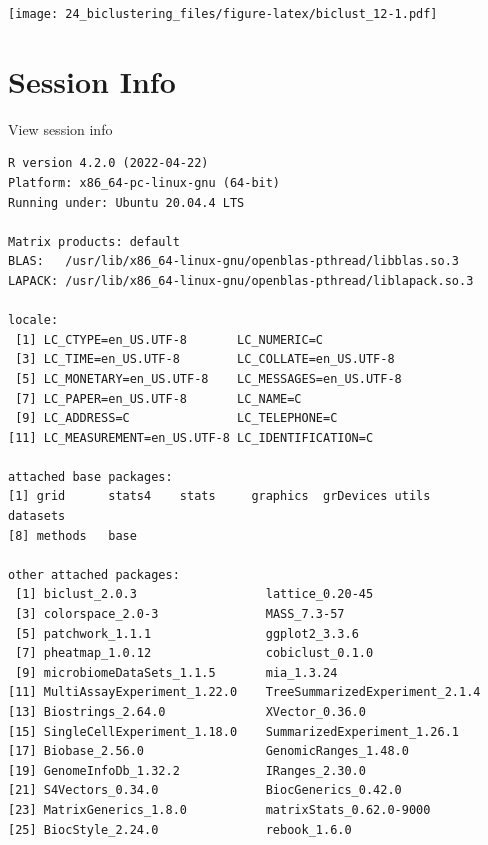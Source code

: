 \documentclass[
]{book}
\begin{document}
\texttt{[image: 24\_biclustering\_files/figure-latex/biclust\_12-1.pdf]}

\hypertarget{session-info-7}{%
\section*{Session Info}\label{session-info-7}}

View session info

\begin{verbatim}
R version 4.2.0 (2022-04-22)
Platform: x86_64-pc-linux-gnu (64-bit)
Running under: Ubuntu 20.04.4 LTS

Matrix products: default
BLAS:   /usr/lib/x86_64-linux-gnu/openblas-pthread/libblas.so.3
LAPACK: /usr/lib/x86_64-linux-gnu/openblas-pthread/liblapack.so.3

locale:
 [1] LC_CTYPE=en_US.UTF-8       LC_NUMERIC=C              
 [3] LC_TIME=en_US.UTF-8        LC_COLLATE=en_US.UTF-8    
 [5] LC_MONETARY=en_US.UTF-8    LC_MESSAGES=en_US.UTF-8   
 [7] LC_PAPER=en_US.UTF-8       LC_NAME=C                 
 [9] LC_ADDRESS=C               LC_TELEPHONE=C            
[11] LC_MEASUREMENT=en_US.UTF-8 LC_IDENTIFICATION=C       

attached base packages:
[1] grid      stats4    stats     graphics  grDevices utils     datasets 
[8] methods   base     

other attached packages:
 [1] biclust_2.0.3                  lattice_0.20-45               
 [3] colorspace_2.0-3               MASS_7.3-57                   
 [5] patchwork_1.1.1                ggplot2_3.3.6                 
 [7] pheatmap_1.0.12                cobiclust_0.1.0               
 [9] microbiomeDataSets_1.1.5       mia_1.3.24                    
[11] MultiAssayExperiment_1.22.0    TreeSummarizedExperiment_2.1.4
[13] Biostrings_2.64.0              XVector_0.36.0                
[15] SingleCellExperiment_1.18.0    SummarizedExperiment_1.26.1   
[17] Biobase_2.56.0                 GenomicRanges_1.48.0          
[19] GenomeInfoDb_1.32.2            IRanges_2.30.0                
[21] S4Vectors_0.34.0               BiocGenerics_0.42.0           
[23] MatrixGenerics_1.8.0           matrixStats_0.62.0-9000       
[25] BiocStyle_2.24.0               rebook_1.6.0                  


\end{verbatim}
\end{document}
